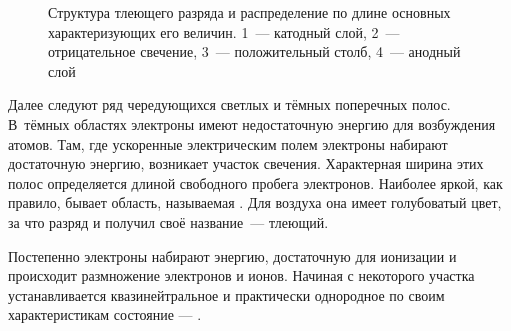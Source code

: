 \begin{labsupplement}



\begin{figure}[h!]
	\centering
	\caption{Структура тлеющего разряда и распределение по длине основных 
        характеризующих его величин. 
        1~--- катодный слой,
        2~--- отрицательное свечение,
        3~--- положительный столб,
        4~--- анодный слой
        }
\end{figure}

Далее следуют ряд чередующихся светлых и тёмных поперечных полос. 
В~тёмных областях электроны имеют недостаточную энергию 
для возбуждения атомов. Там, где ускоренные электрическим полем электроны 
набирают достаточную энергию, возникает участок свечения.
Характерная ширина этих полос определяется длиной свободного пробега электронов.
Наиболее яркой, как правило, бывает область,
называемая .
Для воздуха она имеет голубоватый цвет, за что разряд и получил своё 
название~--- тлеющий.

Постепенно электроны набирают энергию, достаточную для ионизации
и происходит размножение электронов и ионов.
Начиная с некоторого участка устанавливается квазинейтральное
и практически однородное по своим характеристикам состояние 
--- .





\end{labsupplement}
